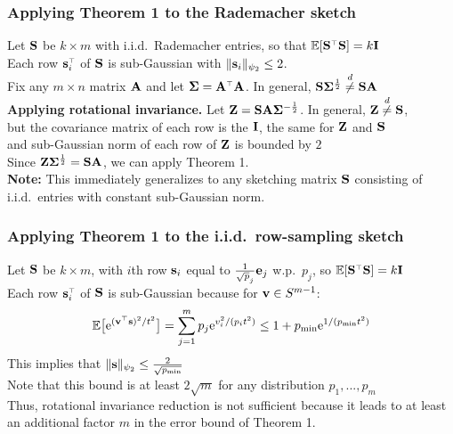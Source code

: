 \documentclass[10pt]{beamer}
\begin{document}
  \begin{frame}
    \frametitle{Applying Theorem 1 to the Rademacher sketch}
   Let $\S$ be $k\times m$ with i.i.d.~Rademacher entries, so that $\E[\S^\top\S]=k\I$\\
   Each row $\s_i^\top$ of $\S$ is sub-Gaussian with
   $\|\s_i\|_{\psi_2}\leq 2$.\\
   Fix any $m\times n$ matrix $\A$ and let $\Sigmab=\A^\top\A$. In
   general,   $\S\Sigmab^{\frac12}\overset{d}{\neq}\S\A$\\[5mm] 

   \textbf{Applying rotational invariance.}
   Let $\Z = \S\A\Sigmab^{-\frac12}$. In general,
   $\Z\overset{d}{\neq}\S$,\\
   but the covariance matrix of each row is the $\I$, the same for
   $\Z$ and $\S$\\
   and sub-Gaussian norm of each row of $\Z$ is bounded by $2$\\
   Since $\Z\Sigmab^{\frac12}=\S\A$, we can apply Theorem 1.\\[5mm]

\textbf{Note:} This immediately generalizes to any sketching matrix
$\S$ consisting of i.i.d.~entries with constant sub-Gaussian norm.
 \end{frame}

 \begin{frame}
   \frametitle{Applying Theorem 1 to the i.i.d.~row-sampling sketch}
   Let $\S$ be $k\times m$, with $i$th row $\s_i$ equal to
   $\frac1{\sqrt p_{j}}\e_j$ w.p.~$p_j$, so $\E[\S^\top\S]=k\I$\\
   Each row $\s_i^\top$ of $\S$ is sub-Gaussian because for $\v\in S^{m-1}$:
   \begin{align*}
\E\big[\ee^{(\v^\top\s)^2/t^2}\big] =
     \sum_{j=1}^mp_j\ee^{v_i^2/(p_it^2)}\leq 1 +
     p_{\min}\ee^{1/(p_{\min}t^2)}
   \end{align*}
   This implies that $\|\s\|_{\psi_2}\leq \frac2{\sqrt{p_{\min}}}$\\
   Note that this bound is at least $2\sqrt m$ for any distribution $p_1,...,p_m$\\[5mm]
Thus, rotational invariance reduction is not sufficient because it
leads to at least an additional factor $m$ in the error bound of
Theorem 1.
 \end{frame}
\end{document}

